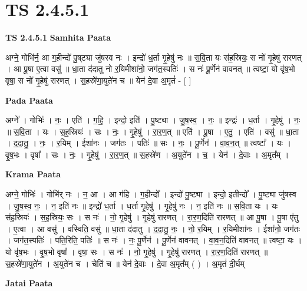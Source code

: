 \documentclass[17pt]{extarticle}
\begin{document}
\section{ TS 2.4.5.1 }

\textbf{TS 2.4.5.1 } \newline
\textbf{Samhita Paata} \newline

अग्ने॒ गोभि॑र्न॒ आ ग॒हीन्दो॑ पु॒ष्‌ट्या जु॑षस्व नः । इन्द्रो॑ ध॒र्ता गृ॒हेषु॑ नः ॥ स॒वि॒ता यः स॑ह॒स्रियः॒ स नो॑ गृ॒हेषु॑ रारणत् । आ पू॒षा ए॒त्वा वसु॑ ॥ धा॒ता द॑दातु नो र॒यिमीशा॑नो॒ जग॑त॒स्पतिः॑ । स नः॑ पू॒र्णेन॑ वावनत् ॥ त्वष्टा॒ यो वृ॑ष॒भो वृषा॒ स नो॑ गृ॒हेषु॑ रारणत् । स॒हस्रे॑णा॒युते॑न च ॥ येन॑ दे॒वा अ॒मृतं॑ - [  ] \newline

\textbf{Pada Paata} \newline

अग्ने᳚ । गोभिः॑ । नः॒ । एति॑ । ग॒हि॒ । इन्दो॒ इति॑ । पु॒ष्ट्या । जु॒ष॒स्व॒ । नः॒ ॥ इन्द्रः॑ । ध॒र्ता । गृ॒हेषु॑ । नः॒ ॥ स॒वि॒ता । यः । स॒ह॒स्रियः॑ । सः । नः॒ । गृ॒हेषु॑ । रा॒र॒ण॒त् ॥ एति॑ । पू॒षा । ए॒तु॒ । एति॑ । वसु॑ ॥ धा॒ता । द॒दा॒तु॒ । नः॒ । र॒यिम् । ईशा॑नः । जग॑तः । पतिः॑ ॥ सः । नः॒ । पू॒र्णेन॑ । वा॒व॒न॒त् ॥ त्वष्टा᳚ । यः । वृ॒ष॒भः । वृषा᳚ । सः । नः॒ । गृ॒हेषु॑ । रा॒र॒ण॒त् ॥ स॒हस्रे॑ण । अ॒युते॑न । च॒ । येन॑ । दे॒वाः । अ॒मृत᳚म् ।  \newline


\textbf{Krama Paata} \newline

अग्ने॒ गोभिः॑ । गोभि॑र् नः । न॒ आ । आ ग॑हि । ग॒हीन्दो᳚ । इन्दो॑ पु॒ष्ट्या । इन्दो॒ इतीन्दो᳚ । पु॒ष्ट्या जु॑षस्व । जु॒ष॒स्व॒ नः॒ । न॒ इति॑ नः ॥ इन्द्रो॑ ध॒र्ता । ध॒र्ता गृ॒हेषु॑ । गृ॒हेषु॑ नः । न॒ इति॑ नः ॥ स॒वि॒ता यः । यः स॑ह॒स्रियः॑ । स॒ह॒स्रियः॒ सः । स नः॑ । नो॒ गृ॒हेषु॑ । गृ॒हेषु॑ रारणत् । रा॒र॒ण॒दिति॑ रारणत् ॥ आ पू॒षा । पू॒षा ए॑तु । ए॒त्वा । आ वसु॑ । वस्विति॒ वसु॑ ॥ धा॒ता द॑दातु । द॒दा॒तु॒ नः॒ । नो॒ र॒यिम् । र॒यिमीशा॑नः । ईशा॑नो॒ जग॑तः । जग॑त॒स्पतिः॑ । पति॒रिति॒ पतिः॑ ॥ स नः॑ । नः॒ पू॒र्णेन॑ । पू॒र्णेन॑ वावनत् । वा॒व॒न॒दिति॑ वावनत् ॥ त्वष्टा॒ यः । यो वृ॑ष॒भः । वृ॒ष॒भो वृषा᳚ । वृषा॒ सः । स नः॑ । नो॒ गृ॒हेषु॑ । गृ॒हेषु॑ रारणत् । रा॒र॒ण॒दिति॑ रारणत् ॥ स॒हस्रे॑णा॒युते॑न । अ॒युते॑न च । चेति॑ च ॥ येन॑ दे॒वाः । दे॒वा अ॒मृत᳚म् ( ) । अ॒मृतं॑ दी॒र्घम् \newline

\textbf{Jatai Paata} \newline
\end{document}
